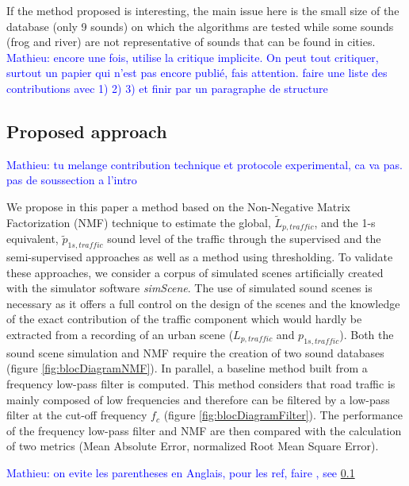 \documentclass[twocolumn,a4paper,10pt]{article}
\newcommand{\ml}[1]{\textcolor{blue}{ Mathieu: #1}}
\begin{document}
 If the method proposed is interesting, the main issue here is the small size of the database (only 9 sounds) on which the algorithms are tested while some sounds (frog and river) are not representative of sounds that can be found in cities.
 \ml{encore une fois, utilise la critique implicite. On peut tout critiquer, surtout un papier qui n'est pas encore publié, fais attention. faire une liste des contributions avec 1) 2) 3) et finir par un paragraphe de structure}

\subsection{Proposed approach}

\ml{tu melange contribution technique et protocole experimental, ca va pas. pas de soussection a l'intro}

We propose in this paper a method based on the Non-Negative Matrix Factorization (NMF) technique to estimate the global, $\tilde{L}_{p,traffic}$, and the 1-s equivalent, $\tilde{p}_{1s,traffic}$ sound level of the traffic through the supervised and the semi-supervised approaches as well as a method using thresholding. To validate these approaches, we consider a corpus of simulated scenes artificially created with the simulator software \textit{simScene}. The use of simulated sound scenes is necessary as it offers a full control on the design of the scenes and the knowledge of the exact contribution of the traffic component which would hardly be extracted from a recording of an urban scene ($L_{p,traffic}$ and $p_{1s,traffic}$). Both the sound scene simulation and NMF require the creation of two sound databases (figure  \ref{fig:blocDiagramNMF}). In parallel, a baseline method built from a frequency low-pass filter is computed. This method considers that road traffic is mainly composed of low frequencies and therefore can be filtered by a low-pass filter at the cut-off frequency $f_c$ (figure \ref{fig:blocDiagramFilter}). The performance of the frequency low-pass filter and NMF are then compared with the calculation of two metrics (Mean Absolute Error, normalized Root Mean Square Error).

\ml{on evite les parentheses en Anglais, pour les ref, faire , see \ref{}}
\end{document}
